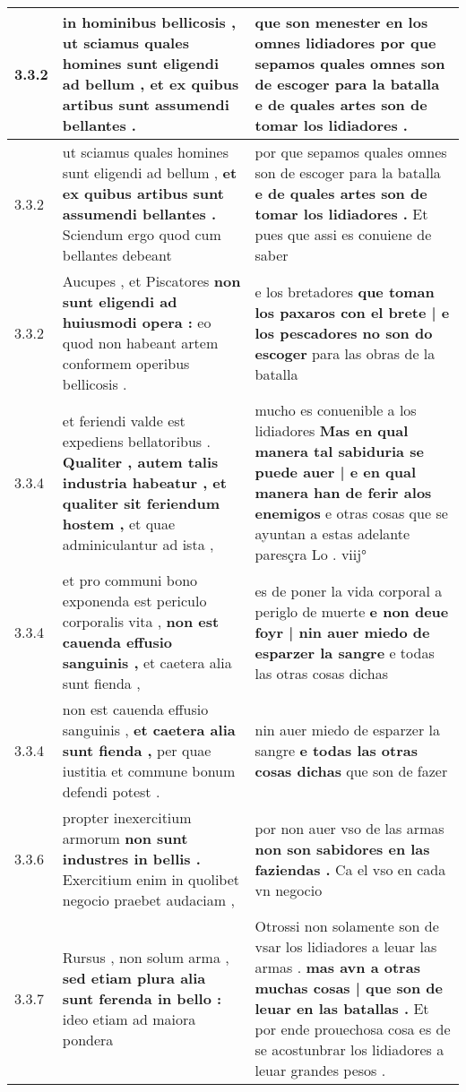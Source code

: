\begin{tabular}{|p{1cm}|p{6.5cm}|p{6.5cm}|}
3.3.2 & in hominibus bellicosis , \textbf{ ut sciamus quales homines sunt eligendi ad bellum , } et ex quibus artibus sunt assumendi bellantes . & que son menester en los omnes lidiadores \textbf{ por que sepamos quales omnes son de escoger para la batalla } e de quales artes son de tomar los lidiadores . \\\hline
3.3.2 & ut sciamus quales homines sunt eligendi ad bellum , \textbf{ et ex quibus artibus sunt assumendi bellantes . } Sciendum ergo quod cum bellantes debeant & por que sepamos quales omnes son de escoger para la batalla \textbf{ e de quales artes son de tomar los lidiadores . } Et pues que assi es conuiene de saber \\\hline
3.3.2 & Aucupes , et Piscatores \textbf{ non sunt eligendi ad huiusmodi opera : } eo quod non habeant artem conformem operibus bellicosis . & e los bretadores \textbf{ que toman los paxaros con el brete | e los pescadores no son do escoger } para las obras de la batalla \\\hline
3.3.4 & et feriendi valde est expediens bellatoribus . \textbf{ Qualiter , autem talis industria habeatur , et qualiter sit feriendum hostem , } et quae adminiculantur ad ista , & mucho es conuenible a los lidiadores \textbf{ Mas en qual manera tal sabiduria se puede auer | e en qual manera han de ferir alos enemigos } e otras cosas que se ayuntan a estas adelante paresçra Lo . viij° \\\hline
3.3.4 & et pro communi bono exponenda est periculo corporalis vita , \textbf{ non est cauenda effusio sanguinis , } et caetera alia sunt fienda , & es de poner la vida corporal a periglo de muerte \textbf{ e non deue foyr | nin auer miedo de esparzer la sangre } e todas las otras cosas dichas \\\hline
3.3.4 & non est cauenda effusio sanguinis , \textbf{ et caetera alia sunt fienda , } per quae iustitia et commune bonum defendi potest . & nin auer miedo de esparzer la sangre \textbf{ e todas las otras cosas dichas } que son de fazer \\\hline
3.3.6 & propter inexercitium armorum \textbf{ non sunt industres in bellis . } Exercitium enim in quolibet negocio praebet audaciam , & por non auer vso de las armas \textbf{ non son sabidores en las faziendas . } Ca el vso en cada vn negocio \\\hline
3.3.7 & Rursus , non solum arma , \textbf{ sed etiam plura alia sunt ferenda in bello : } ideo etiam ad maiora pondera & Otrossi non solamente son de vsar los lidiadores a leuar las armas . \textbf{ mas avn a otras muchas cosas | que son de leuar en las batallas . } Et por ende prouechosa cosa es de se acostunbrar los lidiadores a leuar grandes pesos . \\\hline

\end{tabular}
